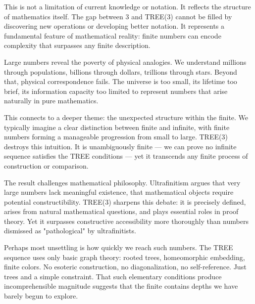 This is not a limitation of current knowledge or notation. It reflects the structure of mathematics itself. The gap between 3 and TREE(3) cannot be filled by discovering new operations or developing better notation. It represents a fundamental feature of mathematical reality: finite numbers can encode complexity that surpasses any finite description.

\begin{commentary}
Large numbers reveal the poverty of physical analogies. We understand millions through populations, billions through dollars, trillions through stars. Beyond that, physical correspondence fails. The universe is too small, its lifetime too brief, its information capacity too limited to represent numbers that arise naturally in pure mathematics.

This connects to a deeper theme: the unexpected structure within the finite. We typically imagine a clear distinction between finite and infinite, with finite numbers forming a manageable progression from small to large. TREE(3) destroys this intuition. It is unambiguously finite — we can prove no infinite sequence satisfies the TREE conditions — yet it transcends any finite process of construction or comparison.

The result challenges mathematical philosophy. Ultrafinitism argues that very large numbers lack meaningful existence, that mathematical objects require potential constructibility. TREE(3) sharpens this debate: it is precisely defined, arises from natural mathematical questions, and plays essential roles in proof theory. Yet it surpasses constructive accessibility more thoroughly than numbers dismissed as "pathological" by ultrafinitists.

Perhaps most unsettling is how quickly we reach such numbers. The TREE sequence uses only basic graph theory: rooted trees, homeomorphic embedding, finite colors. No esoteric construction, no diagonalization, no self-reference. Just trees and a simple constraint. That such elementary conditions produce incomprehensible magnitude suggests that the finite contains depths we have barely begun to explore.
\end{commentary}
